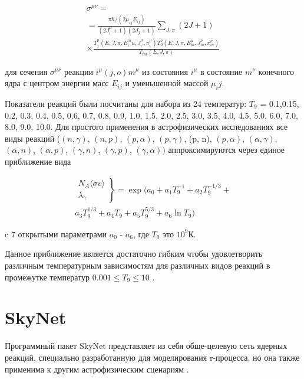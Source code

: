 \documentclass[%
master,    %
natbib,      %
subf,        %
href,        %
colorlinks,  %
]{disser}
\begin{document}
\begin{multline}
\sigma^{\mu\nu} = \\
= \frac{\pi\hbar/(2\mu_{ij}E_{ij})}{(2J_i^\mu+1)(2J_j+1)}\sum_{J,\pi}(2J + 1) \\
\times \frac{T_j^\mu(E,J,\pi,E_i^mu, J_i^\mu,\pi_i^\mu)T_0^\nu(E,J,\pi,E_m^\mu,J_m^\nu,\pi_m^\nu)}{T_{tot}(E,J,\pi)}
\end{multline}

для сечения $\sigma^{\mu\nu}$ реакции $i^\mu(j,o)m^\mu$ из состояния $i^\mu$ в состояние $m^\nu$ конечного ядра с центром энергии масс $E_{ij}$ и уменьшенной массой $\mu_ij$.

Показатели реакций были посчитаны для набора из 24 температур: $T_9$ = 0.1,0.15, 0.2, 0.3, 0.4, 0.5, 0.6, 0.7, 0.8, 0.9, 1.0, 1.5, 2.0, 2.5, 3.0, 3.5, 4.0, 4.5, 5.0, 6.0, 7.0, 8.0, 9.0, 10.0. Для простого применения в астрофизических исследованиях все виды реакций ($(n,\gamma)$, $(n,p)$, $(p,\alpha)$, $(p, \gamma)$, (p, n), $(p, \alpha)$, $(\alpha, \gamma)$, $(\alpha, n)$, $(\alpha, p)$, $(\gamma, n)$, $(\gamma, p)$, $(\gamma, \alpha))$ аппроксимируются через единое приближение вида

\begin{equation}
\label{eq:system}
\begin{split}
\left.
	\begin{array}{ccc}
		N_{A}\langle \sigma v \rangle \\
		\lambda_\gamma
	\end{array}
\right\}
 = \exp (a_0 + a_1 T_9^{-1} + a_2 T_9^{-1/3} + \\
a_3 T_9^{1/3} + a_4 T_9 + a_5 T_9^{5/3} + a_6 \ln T_9)
\end{split}
\end{equation}

c 7 открытыми параметрами $a_0$ - $a_6$, где $T_9$ это $10^9$К.

Данное приближение является достаточно гибким чтобы удовлетворить различным температурным зависимостям для различных видов реакций в промежутке температур $0.001 \le T_9 \le 10$ \cite{rates}.

\section{SkyNet}

Программный пакет SkyNet представляет из себя обще-целевую сеть ядерных реакций, специально разработанную для моделирования r-процесса, но она также применима к другим астрофизическим сценариям \cite{skynet}.
\end{document}
